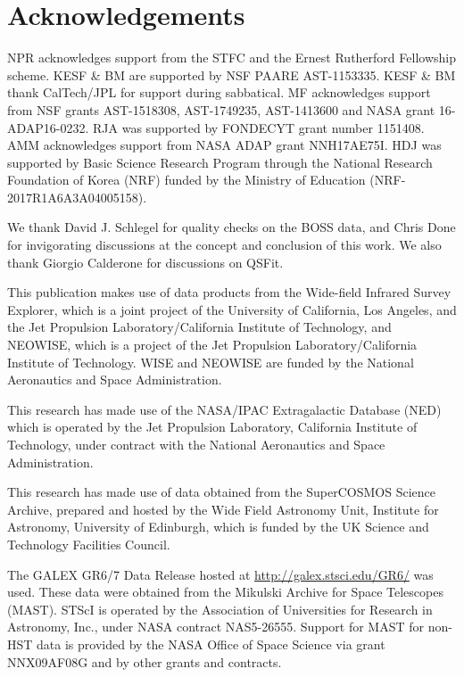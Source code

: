 \documentclass[a4paper,fleqn,usenatbib]{mnras}
\begin{document}
\section*{Acknowledgements}
NPR acknowledges support from the STFC and the Ernest Rutherford
Fellowship scheme.  KESF \& BM are supported by NSF PAARE
AST-1153335. KESF \& BM thank CalTech/JPL for support during
sabbatical.  MF acknowledges support from NSF grants AST-1518308,
AST-1749235, AST-1413600 and NASA grant 16-ADAP16-0232.  RJA was
supported by FONDECYT grant number 1151408. AMM acknowledges support
from NASA ADAP grant NNH17AE75I. HDJ was supported by Basic Science
Research Program through the National Research Foundation of Korea
(NRF) funded by the Ministry of Education (NRF-2017R1A6A3A04005158).

We thank David J. Schlegel for quality checks on the BOSS data, and
Chris Done for invigorating discussions at the concept and conclusion
of this work. We also thank Giorgio Calderone for discussions on 
QSFit.  

This publication makes use of data products from the Wide-field
Infrared Survey Explorer, which is a joint project of the University
of California, Los Angeles, and the Jet Propulsion
Laboratory/California Institute of Technology, and NEOWISE, which is a
project of the Jet Propulsion Laboratory/California Institute of
Technology. WISE and NEOWISE are funded by the National Aeronautics
and Space Administration.

This research has made use of the NASA/IPAC Extragalactic Database
(NED) which is operated by the Jet Propulsion Laboratory, California
Institute of Technology, under contract with the National Aeronautics
and Space Administration.

This research has made use of data obtained from the SuperCOSMOS
Science Archive, prepared and hosted by the Wide Field Astronomy Unit,
Institute for Astronomy, University of Edinburgh, which is funded by
the UK Science and Technology Facilities Council.

The GALEX GR6/7 Data Release hosted at
\href{http://galex.stsci.edu/GR6/}{http://galex.stsci.edu/GR6/} was
used. These data were obtained from the Mikulski Archive for Space
Telescopes (MAST). STScI is operated by the Association of
Universities for Research in Astronomy, Inc., under NASA contract
NAS5-26555. Support for MAST for non-HST data is provided by the NASA
Office of Space Science via grant NNX09AF08G and by other grants and
contracts.
\end{document}
